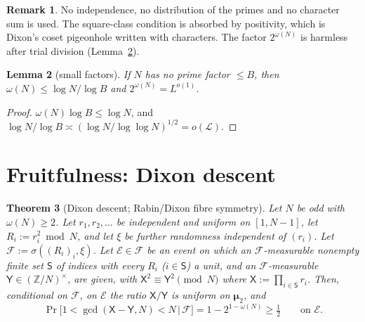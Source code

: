 \documentclass[11pt]{amsart}
\newtheorem{theorem}{Theorem}[section]
\newtheorem{lemma}[theorem]{Lemma}
\theoremstyle{definition}
\newtheorem{remark}[theorem]{Remark}
\newcommand{\Z}{\mathbb{Z}}
\newcommand{\cE}{\mathcal{E}}
\newcommand{\cF}{\mathcal{F}}
\newcommand{\cL}{\mathcal{L}}
\newcommand{\sS}{\mathsf{S}}
\newcommand{\sX}{\mathsf{X}}
\newcommand{\sY}{\mathsf{Y}}
\newcommand{\bmu}{\boldsymbol{\mu}_2}
\newcommand{\Prob}{\Pr}
\begin{document}
\begin{remark}
No independence, no distribution of the primes and no character sum is used. The
square-class condition is absorbed by positivity, which is Dixon's coset pigeonhole written with
characters. The factor $2^{\omega(N)}$ is harmless after trial division (Lemma~\ref{lem:omega}).
\end{remark}

\begin{lemma}[small factors]\label{lem:omega}
If $N$ has no prime factor $\le B$, then $\omega(N)\le\log N/\log B$ and $2^{\omega(N)}=L^{o(1)}$.
\end{lemma}

\begin{proof}
$\omega(N)\log B\le\log N$, and $\log N/\log B\asymp(\log N/\log\log N)^{1/2}=o(\cL)$.
\end{proof}

\section{Fruitfulness: Dixon descent}\label{sec:DD}

\begin{theorem}[Dixon descent; Rabin/Dixon fibre symmetry]\label{thm:DD}
Let $N$ be odd with $\omega(N)\ge2$. Let $r_1,r_2,\dots$ be independent and uniform on $[1,N-1]$, let $R_i:=r_i^2\bmod N$, and let
$\xi$ be further randomness independent of $(r_i)$. Let $\cF:=\sigma((R_i)_i,\xi)$. Let $\cE\in\cF$ be an event on which
an $\cF$-measurable nonempty finite set $\sS$ of indices with every $R_i$ ($i\in\sS$) a unit, and an $\cF$-measurable
$\sY\in(\Z/N)^\times$, are given, with
$\sX^2\equiv\sY^2\pmod N$ where $\sX:=\prod_{i\in\sS}r_i$. Then, conditional on $\cF$, on $\cE$ the ratio $\sX/\sY$ is uniform on $\bmu$, and
\[
\Prob\bigl[1<\gcd(\sX-\sY,N)<N\,\big|\,\cF\bigr]=1-2^{1-\omega(N)}\ge\tfrac12\qquad\text{on }\cE.
\]
\end{theorem}
\end{document}
